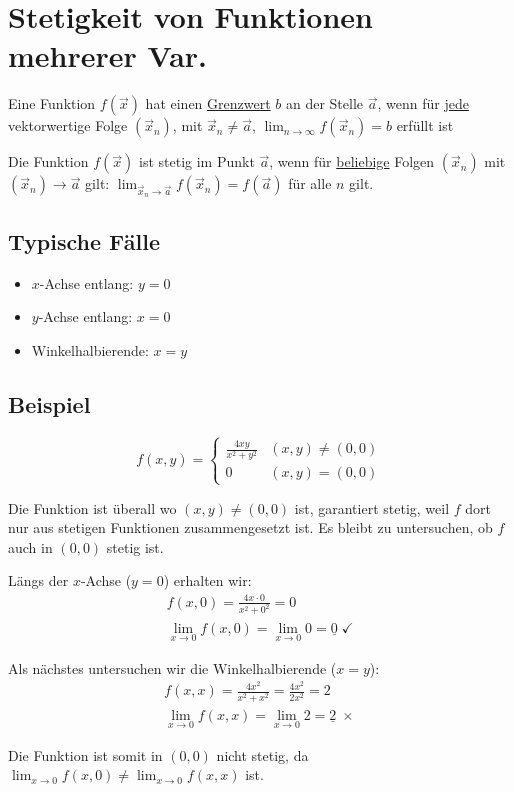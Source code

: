 \section{Stetigkeit von Funktionen mehrerer Var.}
\begin{definition}[Grenzwert]
Eine Funktion $f(\vec{x})$ hat einen \underline{Grenzwert} $b$ an der Stelle
$\vec{a}$, wenn für \underline{jede} vektorwertige Folge $(\vec{x}_n)$,
mit $\vec{x}_n \neq \vec{a}$, $\lim_{n \to \infty}f(\vec{x}_n) = b$ erfüllt ist
\end{definition}
\begin{definition}[Stetigkeit]
Die Funktion $f(\vec{x})$ ist stetig im Punkt $\vec{a}$, wenn für
\underline{beliebige} Folgen $(\vec{x}_n)$ mit
$(\vec{x}_n) \to \vec{a}$ gilt: $\lim_{\vec{x}_n \to \vec{a}} f(\vec{x}_n) = f(\vec{a})$
für alle $n$ gilt.
\end{definition}

\subsection{Typische Fälle}
\begin{itemize}
	\item $x$-Achse entlang: $y = 0$
	\item $y$-Achse entlang: $x = 0$
	\item Winkelhalbierende: $x = y$
\end{itemize}

\subsection*{Beispiel}
\[
f(x, y) = \begin{cases}
	\frac{4xy}{x^2 + y^2} & (x,y) \neq (0,0)\\
	0 & (x,y) = (0,0)
\end{cases}
\]

Die Funktion ist überall wo $(x, y) \neq (0,0)$ ist, garantiert stetig, weil $f$ dort nur aus stetigen Funktionen zusammengesetzt ist. Es bleibt zu untersuchen, ob $f$ auch in $(0,0)$ stetig ist.

Längs der $x$-Achse ($y = 0$) erhalten wir:
\begin{align*}
f(x, 0) = \frac{4x \cdot 0}{x^2 + 0^2} = 0\\
\lim_{x \to 0} f(x, 0) = \lim_{x \to 0} 0 = \underline{0} \; \checkmark
\end{align*}

Als nächstes untersuchen wir die Winkelhalbierende ($x = y$):
\begin{align*}
f(x, x) = \frac{4x^2}{x^2 + x^2} = \frac{4x^2}{2x^2} = 2\\
\lim_{x \to 0} f(x, x) = \lim_{x \to 0} 2 = \underline{2} \; \times
\end{align*}

Die Funktion ist somit in $(0,0)$ nicht stetig, da
$\lim_{x \to 0} f(x, 0) \neq \lim_{x \to 0} f(x, x)$ ist.